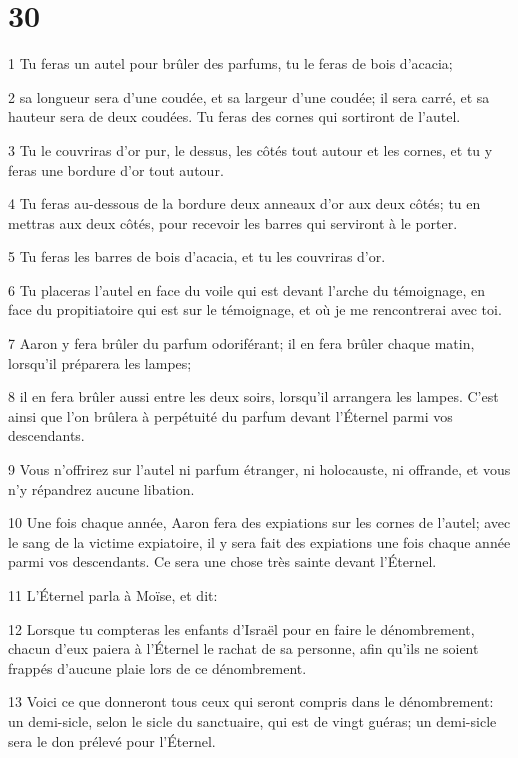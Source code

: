 \chapter{30}

\par 1 Tu feras un autel pour brûler des parfums, tu le feras de bois d'acacia;
\par 2 sa longueur sera d'une coudée, et sa largeur d'une coudée; il sera carré, et sa hauteur sera de deux coudées. Tu feras des cornes qui sortiront de l'autel.
\par 3 Tu le couvriras d'or pur, le dessus, les côtés tout autour et les cornes, et tu y feras une bordure d'or tout autour.
\par 4 Tu feras au-dessous de la bordure deux anneaux d'or aux deux côtés; tu en mettras aux deux côtés, pour recevoir les barres qui serviront à le porter.
\par 5 Tu feras les barres de bois d'acacia, et tu les couvriras d'or.
\par 6 Tu placeras l'autel en face du voile qui est devant l'arche du témoignage, en face du propitiatoire qui est sur le témoignage, et où je me rencontrerai avec toi.
\par 7 Aaron y fera brûler du parfum odoriférant; il en fera brûler chaque matin, lorsqu'il préparera les lampes;
\par 8 il en fera brûler aussi entre les deux soirs, lorsqu'il arrangera les lampes. C'est ainsi que l'on brûlera à perpétuité du parfum devant l'Éternel parmi vos descendants.
\par 9 Vous n'offrirez sur l'autel ni parfum étranger, ni holocauste, ni offrande, et vous n'y répandrez aucune libation.
\par 10 Une fois chaque année, Aaron fera des expiations sur les cornes de l'autel; avec le sang de la victime expiatoire, il y sera fait des expiations une fois chaque année parmi vos descendants. Ce sera une chose très sainte devant l'Éternel.
\par 11 L'Éternel parla à Moïse, et dit:
\par 12 Lorsque tu compteras les enfants d'Israël pour en faire le dénombrement, chacun d'eux paiera à l'Éternel le rachat de sa personne, afin qu'ils ne soient frappés d'aucune plaie lors de ce dénombrement.
\par 13 Voici ce que donneront tous ceux qui seront compris dans le dénombrement: un demi-sicle, selon le sicle du sanctuaire, qui est de vingt guéras; un demi-sicle sera le don prélevé pour l'Éternel.
